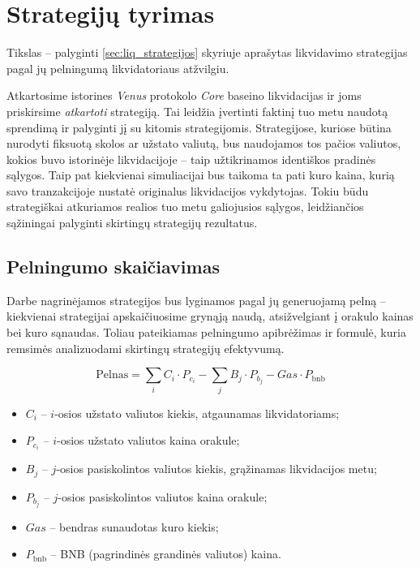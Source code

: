 \documentclass[]{VUMIFTemplateClass}
\begin{document}
\section{Strategijų tyrimas}
Tikslas – palyginti \ref{sec:liq_strategijos} skyriuje aprašytas likvidavimo strategijas pagal jų pelningumą likvidatoriaus atžvilgiu.

Atkartosime istorines \textit{Venus} protokolo \textit{Core} baseino likvidacijas ir joms priskirsime \textit{atkartoti} strategiją. Tai leidžia įvertinti faktinį tuo metu naudotą sprendimą ir palyginti jį su kitomis strategijomis. Strategijose, kuriose būtina nurodyti fiksuotą skolos ar užstato valiutą, bus naudojamos tos pačios valiutos, kokios buvo istorinėje likvidacijoje – taip užtikrinamos identiškos pradinės sąlygos. Taip pat kiekvienai simuliacijai bus taikoma ta pati kuro kaina, kurią savo tranzakcijoje nustatė originalus likvidacijos vykdytojas. Tokiu būdu strategiškai atkuriamos realios tuo metu galiojusios sąlygos, leidžiančios sąžiningai palyginti skirtingų strategijų rezultatus.

\subsection{Pelningumo skaičiavimas}

Darbe nagrinėjamos strategijos bus lyginamos pagal jų generuojamą pelną – kiekvienai strategijai apskaičiuosime grynąją naudą, atsižvelgiant į orakulo kainas bei kuro sąnaudas. Toliau pateikiamas pelningumo apibrėžimas ir formulė, kuria remsimės analizuodami skirtingų strategijų efektyvumą.

\[
\text{Pelnas} = \sum_{i} C_i \cdot P_{c_i} - \sum_{j} B_j \cdot P_{b_j} - Gas \cdot P_\text{bnb}
\]

\begin{itemize}
    \item $C_i$ – $i$-osios užstato valiutos kiekis, atgaunamas likvidatoriams;
    \item $P_{c_i}$ – $i$-osios užstato valiutos kaina orakule;
    \item $B_j$ – $j$-osios pasiskolintos valiutos kiekis, grąžinamas likvidacijos metu;
    \item $P_{b_j}$ – $j$-osios pasiskolintos valiutos kaina orakule;
    \item $Gas$ – bendras sunaudotas kuro kiekis;
    \item $P_\text{bnb}$ – BNB (pagrindinės grandinės valiutos) kaina.
\end{itemize}
\end{document}
